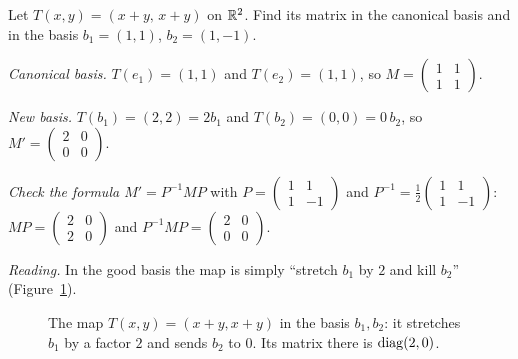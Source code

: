 \begin{example}\label{ex:changebasis}
  Let $T(x,y)=(x+y,\,x+y)$ on $\mathbb{R}^2$. Find its matrix in the canonical basis and in the basis $b_1=(1,1)$, $b_2=(1,-1)$.
\end{example}
\begin{solution}
  \begin{steps}
    \item \emph{Canonical basis.} $T(e_1)=(1,1)$ and $T(e_2)=(1,1)$, so $M=\begin{pmatrix}1&1\\1&1\end{pmatrix}$.
    \item \emph{New basis.} $T(b_1)=(2,2)=2b_1$ and $T(b_2)=(0,0)=0\,b_2$, so $M'=\begin{pmatrix}2&0\\0&0\end{pmatrix}$.
    \item \emph{Check the formula $M'=P^{-1}MP$} with $P=\begin{pmatrix}1&1\\1&-1\end{pmatrix}$ and $P^{-1}=\tfrac12\begin{pmatrix}1&1\\1&-1\end{pmatrix}$: $MP=\begin{pmatrix}2&0\\2&0\end{pmatrix}$ and $P^{-1}MP=\begin{pmatrix}2&0\\0&0\end{pmatrix}$.
    \item \emph{Reading.} In the good basis the map is simply ``stretch $b_1$ by $2$ and kill $b_2$'' (Figure~\ref{fig:changebasis}).
  \end{steps}
\end{solution}

\begin{figure}[htb]
  \centering
  \caption{The map $T(x,y)=(x+y,x+y)$ in the basis $b_1,b_2$: it stretches $b_1$ by a factor $2$ and sends $b_2$ to $0$. Its matrix there is $\operatorname{diag}(2,0)$.}
  \label{fig:changebasis}
\end{figure}

